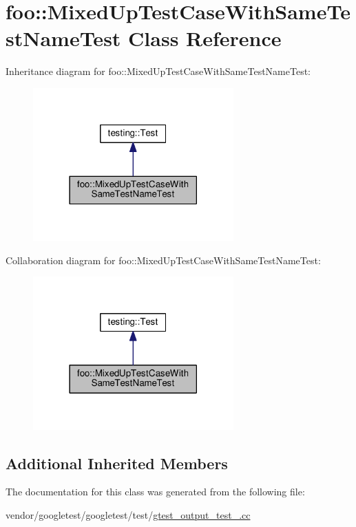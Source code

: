 \hypertarget{classfoo_1_1MixedUpTestCaseWithSameTestNameTest}{}\section{foo\+:\+:Mixed\+Up\+Test\+Case\+With\+Same\+Test\+Name\+Test Class Reference}
\label{classfoo_1_1MixedUpTestCaseWithSameTestNameTest}


Inheritance diagram for foo\+:\+:Mixed\+Up\+Test\+Case\+With\+Same\+Test\+Name\+Test\+:\nopagebreak
\begin{figure}[H]
\begin{center}
\leavevmode
\includegraphics[width=218pt]{classfoo_1_1MixedUpTestCaseWithSameTestNameTest__inherit__graph}
\end{center}
\end{figure}


Collaboration diagram for foo\+:\+:Mixed\+Up\+Test\+Case\+With\+Same\+Test\+Name\+Test\+:\nopagebreak
\begin{figure}[H]
\begin{center}
\leavevmode
\includegraphics[width=218pt]{classfoo_1_1MixedUpTestCaseWithSameTestNameTest__coll__graph}
\end{center}
\end{figure}
\subsection*{Additional Inherited Members}


The documentation for this class was generated from the following file\+:\begin{DoxyCompactItemize}
\item 
vendor/googletest/googletest/test/\hyperlink{gtest__output__test___8cc}{gtest\+\_\+output\+\_\+test\+\_\+.\+cc}\end{DoxyCompactItemize}
